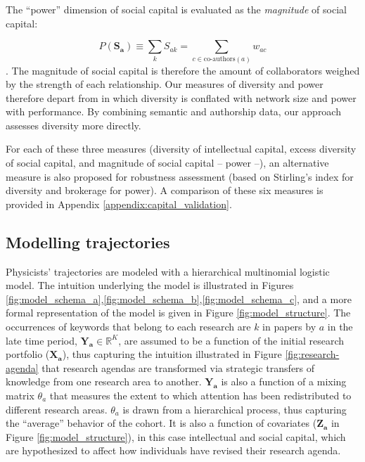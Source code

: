 \documentclass{article}
\begin{document}
The ``power'' dimension of social capital is evaluated as the \textit{magnitude} of social capital:

\begin{equation}
    P(\bm{S_a})\equiv \sum_k S_{ak} = \sum_{c \in \text{co-authors}(a)} w_{ac}
\end{equation}. The magnitude of social capital is therefore the amount of collaborators weighed by the strength of each relationship. Our measures of diversity and power therefore depart from \citealt{Abbasi2014} in which diversity is conflated with network size and power with performance. By combining semantic and authorship data, our approach assesses diversity more directly. %

For each of these three measures (diversity of intellectual capital, excess diversity of social capital, and magnitude of social capital -- power --), an alternative measure is also proposed for robustness assessment (based on Stirling's index for diversity and brokerage for power). A comparison of these six measures is provided in Appendix \ref{appendix:capital_validation}. 

\subsection{\label{sec:model}Modelling trajectories}

Physicists' trajectories are modeled with a hierarchical multinomial logistic model. The intuition underlying the model is illustrated in Figures \ref{fig:model_schema_a},\ref{fig:model_schema_b},\ref{fig:model_schema_c}, and a more formal representation of the model is given in Figure \ref{fig:model_structure}. The occurrences of keywords that belong to each research are $k$ in papers by $a$ in the late time period, $\bm{Y_{a}} \in \mathbb{R}^K$, are assumed to be a function of the initial research portfolio ($\bm{X_{a}}$), thus capturing the intuition illustrated in Figure \ref{fig:research-agenda} that research agendas are transformed via strategic transfers of knowledge from one research area to another. $\bm{Y_{a}}$ is also a function of a mixing matrix $\theta_a$ that measures the extent to which attention has been redistributed to different research areas. $\theta_a$ is drawn from a hierarchical process, thus capturing the ``average'' behavior of the cohort. It is also a function of covariates ($\bm{Z_a}$ in Figure \ref{fig:model_structure}), in this case intellectual and social capital, which are hypothesized to affect how individuals have revised their research agenda. %
\end{document}
